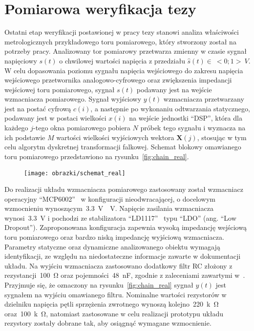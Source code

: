 \chapter{Pomiarowa weryfikacja tezy}

Ostatni etap weryfikacji postawionej w pracy tezy stanowi analiza właściwości metrologicznych przykładowego toru pomiarowego, który stworzony został na potrzeby pracy. Analizowany tor pomiarowy przetwarza zmienny w czasie sygnał napięciowy $s(t)$ o chwilowej wartości napięcia z przedziału $\hat{s}(t) \in~<0;1>~\unit{V}$. W celu dopasowania poziomu sygnału napięcia wejściowego do zakresu napięcia wejściowego przetwornika analogowo-cyfrowego oraz zwiększenia impedancji wejściowej toru pomiarowego, sygnał $s(t)$ podawany jest na wejście wzmacniacza pomiarowego. Sygnał wyjściowy $y(t)$ wzmacniacza przetwarzany jest na postać cyfrową $c(i)$, a następnie po wykonaniu odtwarzania statycznego, podawany jest w postaci wielkości $x(i)$ na wejście jednostki \enquote{DSP}, która dla każdego $j$-tego okna pomiarowego pobiera $N$ próbek tego sygnału i wyznacza na ich podstawie $M$ wartości wielkości wyjściowych wektora $\mathbf{X}(j)$, stosując w tym celu algorytm dyskretnej transformacji falkowej. Schemat blokowy omawianego toru pomiarowego przedstawiono na rysunku~\ref{fig:chain_real}.

\begin{figure}[htb!]
\begin{center}
\texttt{[image: obrazki/schemat\_real]}
\end{center}
\end{figure}

Do realizacji układu wzmacniacza pomiarowego zastosowany został wzmacniacz operacyjny \enquote{MCP6002}~\cite{microchip_manual} w konfiguracji nieodwracającej, o docelowym wzmocnieniu wynoszącym~\qty{3.3}{V \per V}. Napięcie zasilania wzmacniacza wynosi~\qty{3.3}{V} i pochodzi ze stabilizatora \enquote{LD1117}~\cite{stm_manual} typu \enquote{LDO} (ang. \enquote{Low Dropout}). Zaproponowana konfiguracja zapewnia wysoką impedancję wejściową toru pomiarowego oraz bardzo niską impedancję wyjściową wzmacniacza. Parametry statyczne oraz dynamiczne analizowanego obiektu wymagają identyfikacji, ze względu na niedostateczne informacje zawarte w dokumentacji układu. Na wyjściu wzmacniacza zastosowano dodatkowy filtr RC złożony z rezystancji~\qty{100}{\ohm} oraz pojemności~\qty{48}{nF}, zgodnie z zaleceniami zawartymi w~\cite{baker_sar, microchip_application}. Przyjmuje się, że oznaczony na rysunku~\ref{fig:chain_real} sygnał $y(t)$ jest sygnałem na wyjściu omawianego filtru. Nominalne wartości rezystorów w dzielniku napięcia pętli sprzężenia zwrotnego wynoszą kolejno~\qty{220}{k \ohm} oraz~\qty{100}{k \ohm}, natomiast zastosowane w celu realizacji prototypu układu rezystory zostały dobrane tak, aby osiągnąć wymagane wzmocnienie.

